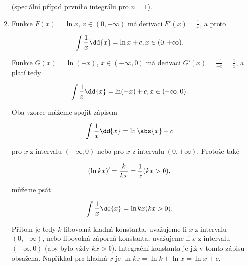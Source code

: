 \begin{enumerate}
\begin{fleqn}[\parindent]
\begin{equation*}
              \end{equation*}
            \end{fleqn}
            (speciální případ prvního integrálu pro \(n=1\)).
      \item Funkce \(F(x)=\ln x\), \(x\in(0,+\infty)\) má derivaci \(F'(x) = \frac{1}{x}\), a proto
            \begin{fleqn}[\parindent]  
              \begin{equation*}
                \int\frac{1}{x}\dd{x} = \ln x + c, \hfill x\in(0,+\infty).
              \end{equation*} 
            \end{fleqn}
            Funkce \(G(x) = \ln(-x)\), \(x\in(-\infty,0)\) má derivaci \(G'(x) = \frac{-1}{-x} =
            \frac{1}{x}\), a platí tedy
            \begin{fleqn}[\parindent]
              \begin{equation*}
                \int\frac{1}{x}\dd{x} = \ln(-x) + c, \hfill x\in(-\infty,0).
              \end{equation*}
            \end{fleqn}
            Oba vzorce můžeme spojit zápisem
            \begin{fleqn}[\parindent]
              \begin{equation*}
                \int\frac{1}{x}\dd{x} = \ln\abs{x} + c
              \end{equation*}
            \end{fleqn}
            pro \(x\) z intervalu \((-\infty,0)\) nebo pro \(x\) z intervalu \((0,+\infty)\).
            Protože také
            \begin{fleqn}[\parindent]
              \begin{equation*}
                (\ln kx)' = \frac{k}{kx} = \frac{1}{x} \hfill (kx>0),
              \end{equation*}
            \end{fleqn}  
            můžeme psát
            \begin{fleqn}[\parindent]
              \begin{equation*}
                \int\frac{1}{x}\dd{x} = \ln kx \hfill (kx>0).
              \end{equation*}
            \end{fleqn}  
            Přitom je tedy \(k\) libovolná kladná konstanta, uvažujeme-li \(x\) z intervalu
            \((0,+\infty)\), nebo libovolná záporná konstanta, uvažujeme-li \(x\) z intervalu
            \((-\infty,0)\) (aby bylo vždy \(kx>0\)). Integrační konstanta je již v tomto zápisu
            obsažena. Například pro kladná \(x\) je \(\ln kx = \ln k + \ln x = \ln x + c\).
            

\end{enumerate}
